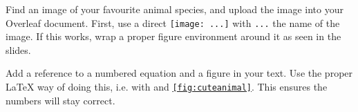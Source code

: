 \documentclass[a4paper]{article}
\begin{document}
\begin{exercise}
    Find an image of your favourite animal species, and upload the image into your
    Overleaf document. First, use a direct \texttt{\texttt{[image: ...]}}
    with \texttt{...} the name of the image. If this works, wrap
    a proper figure environment around it as seen in the slides.
\end{exercise}

\begin{exercise}[reference]
    Add a reference to a numbered equation and a figure in your text. Use the proper
    \LaTeX{} way of doing this, i.e. with \texttt{\label{fig:cuteanimal}}
    and \texttt{\ref{fig:cuteanimal}}. This ensures the numbers will stay
    correct.
\end{exercise}



\end{document}
